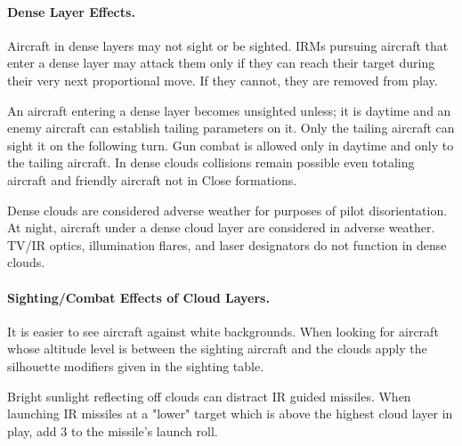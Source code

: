 \paragraph{Dense Layer Effects.} Aircraft in dense layers may not sight or be sighted. IRMs pursuing aircraft that enter a dense layer may attack them only if they can reach their target during their very next proportional move. If they cannot, they are removed from play.

An aircraft entering a dense layer becomes unsighted unless; it is daytime and an enemy aircraft can establish tailing parameters on it. Only the tailing aircraft can sight it on the following turn. Gun combat is allowed only in daytime and only to the tailing aircraft. In dense clouds collisions remain possible even totaling aircraft and friendly aircraft not in Close formations.

Dense clouds are considered adverse weather for purposes of pilot disorientation. At night, aircraft under a dense cloud layer are considered in adverse weather. TV/IR optics, illumination flares, and laser designators do not function in dense clouds.

\paragraph{Sighting/Combat Effects of Cloud Layers.} It is easier to see aircraft against white backgrounds. When looking for aircraft whose altitude level is between the sighting aircraft and the clouds apply the silhouette modifiers given in the sighting table.

Bright sunlight reflecting off clouds can distract IR guided missiles. When launching IR missiles at a "lower" target which is above the highest cloud layer in play, add 3 to the missile's launch roll.

